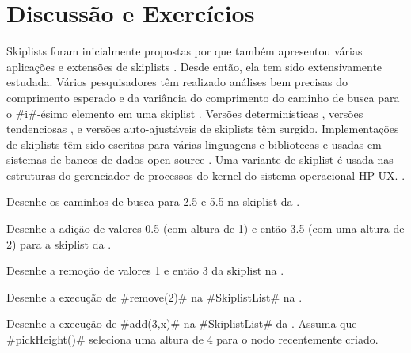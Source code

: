 {%


\section{Discussão e Exercícios}

Skiplists foram inicialmente propostas por \cite{p91} que também apresentou várias aplicações e extensões de skiplists 
\cite{p89}.  Desde então, ela tem sido extensivamente estudada.
Vários pesquisadores têm realizado análises bem precisas do comprimento
esperado e da variância do comprimento do caminho de busca para o
#i#-ésimo elemento em uma skiplist \cite{kp94,kmp95,pmp92}.
Versões determinísticas
 \cite{mps92}, versões tendenciosas \cite{bbg02,esss01},
e versões auto-ajustáveis \cite{bdl08} de skiplists têm surgido.  Implementações de skiplists têm sido escritas para várias linguagens e bibliotecas e usadas em sistemas de bancos de dados open-source \cite{skipdb,redis}. Uma variante de skiplist é usada nas estruturas do gerenciador de processos do kernel do sistema operacional HP-UX. 
\cite{hpux}.


\begin{exc}
  Desenhe os caminhos de busca para 2.5 e 5.5 na skiplist da 
  .
\end{exc}

\begin{exc}
  Desenhe a adição de valores 0.5 (com altura de 1) e então 3.5 (com
  uma altura de 2) para a skiplist da 
  .
\end{exc}

\begin{exc}
  Desenhe a remoção de valores 1 e então 3 da skiplist na 
   .
\end{exc}

\begin{exc}
  Desenhe a execução de 
   #remove(2)# na #SkiplistList# na 
  .
\end{exc}

\begin{exc}
  Desenhe a execução de 
   #add(3,x)# na #SkiplistList#
  da .  Assuma que #pickHeight()# seleciona uma altura
  de 4 para o nodo recentemente criado. 
\end{exc}

}
